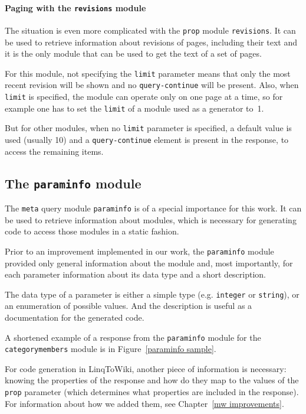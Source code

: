\paragraph{Paging with the \texttt{revisions} module}

The situation is even more complicated with the \texttt{prop} module \texttt{revisions}.
It can be used to retrieve information about revisions of pages, including their text
and it is the only module that can be used to get the text of a set of pages.

For this module, not specifying the \texttt{limit} parameter means that only the most
recent revision will be shown and no \texttt{query-continue} will be present.
Also, when \texttt{limit} is specified, the module can operate only on one page at a time,
so for example one has to set the \texttt{limit} of a module used as a generator to~1.

But for other modules, when no \texttt{limit} parameter is specified, a default value is used (usually 10)
and a \texttt{query-continue} element is present in the response, to access the remaining items.

\subsection{The \texttt{paraminfo} module}
\label{paraminfo}

The \texttt{meta} query module \texttt{paraminfo} is of a special importance for this work.
It can be used to retrieve information about modules,
which is necessary for generating code to access those modules in a static fashion.

Prior to an improvement implemented in our work,
the \texttt{paraminfo} module provided only general information about the module
and, most importantly, for each parameter information about its data type and a short description.

The data type of a parameter is either a simple type (e.g. \texttt{integer} or \texttt{string}),
or an enumeration of possible values.
And the description is useful as a documentation for the generated code.

A shortened example of a response from the \texttt{paraminfo} module
for the \texttt{categorymembers} module is in Figure~\ref{paraminfo sample}.

For code generation in LinqToWiki, another piece of information is necessary:
knowing the properties of the response and how do they map to the values of the \texttt{prop} parameter
(which determines what properties are included in the response).
For information about how we added them, see Chapter~\ref{mw improvements}.

